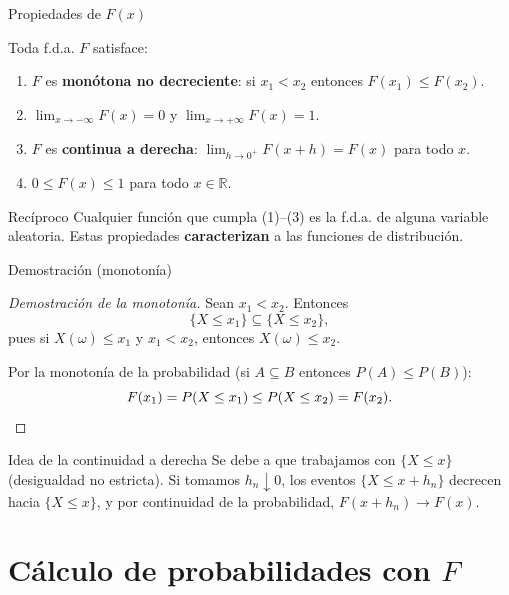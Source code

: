 \documentclass[aspectratio=169,11pt]{beamer}
\begin{document}
\begin{frame}{Propiedades de $F(x)$}
\begin{theorem}
Toda f.d.a. $F$ satisface:
\begin{enumerate}
\item $F$ es \textbf{monótona no decreciente}: si $x_1 < x_2$ entonces $F(x_1) \le F(x_2)$.
\item $\displaystyle\lim_{x \to -\infty} F(x) = 0$ \quad y \quad $\displaystyle\lim_{x \to +\infty} F(x) = 1$.
\item $F$ es \textbf{continua a derecha}: $\displaystyle\lim_{h \to 0^+} F(x+h) = F(x)$ para todo $x$.
\item $0 \le F(x) \le 1$ para todo $x \in \mathbb{R}$.
\end{enumerate}
\end{theorem}

\begin{alertblock}{Recíproco}
Cualquier función que cumpla (1)--(3) es la f.d.a. de alguna variable aleatoria. Estas propiedades \textbf{caracterizan} a las funciones de distribución.
\end{alertblock}
\end{frame}

\begin{frame}{Demostración (monotonía)}
\begin{proof}[Demostración de la monotonía]
Sean $x_1 < x_2$. Entonces
$$\{X \le x_1\} \subseteq \{X \le x_2\},$$
pues si $X(\omega) \le x_1$ y $x_1 < x_2$, entonces $X(\omega) \le x_2$.

Por la monotonía de la probabilidad (si $A \subseteq B$ entonces $P(A) \le P(B)$):
$$F(x_1) = P(X \le x_1) \le P(X \le x_2) = F(x_2). \qedhere$$
\end{proof}

\begin{block}{Idea de la continuidad a derecha}
Se debe a que trabajamos con $\{X \le x\}$ (desigualdad no estricta). Si tomamos $h_n \downarrow 0$, los eventos $\{X \le x + h_n\}$ decrecen hacia $\{X \le x\}$, y por continuidad de la probabilidad, $F(x+h_n) \to F(x)$.
\end{block}
\end{frame}

\section{Cálculo de probabilidades con \texorpdfstring{$F$}{F}}
\end{document}
